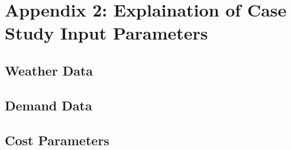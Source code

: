 \documentclass{article}
\begin{document}
\section{Appendix 2: Explaination of Case Study Input Parameters} \label{A2}

\subsection{Weather Data}
\subsection{Demand Data}
\subsection{Cost Parameters}

\begin{thebibliography}{9}


\end{thebibliography}
\end{document}

